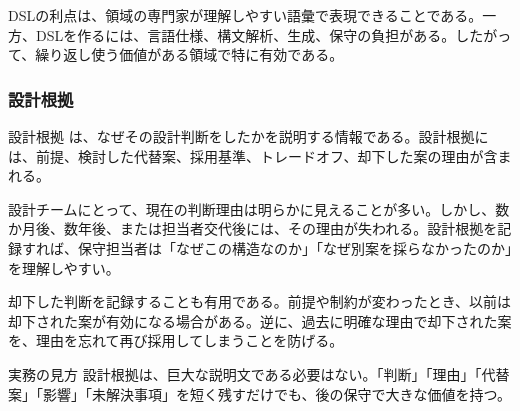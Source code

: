 DSLの利点は、領域の専門家が理解しやすい語彙で表現できることである。一方、DSLを作るには、言語仕様、構文解析、生成、保守の負担がある。したがって、繰り返し使う価値がある領域で特に有効である。

\subsubsection{設計根拠}

設計根拠 は、なぜその設計判断をしたかを説明する情報である。設計根拠には、前提、検討した代替案、採用基準、トレードオフ、却下した案の理由が含まれる。

設計チームにとって、現在の判断理由は明らかに見えることが多い。しかし、数か月後、数年後、または担当者交代後には、その理由が失われる。設計根拠を記録すれば、保守担当者は「なぜこの構造なのか」「なぜ別案を採らなかったのか」を理解しやすい。

却下した判断を記録することも有用である。前提や制約が変わったとき、以前は却下された案が有効になる場合がある。逆に、過去に明確な理由で却下された案を、理由を忘れて再び採用してしまうことを防げる。

\begin{pointbox}{実務の見方}
設計根拠は、巨大な説明文である必要はない。「判断」「理由」「代替案」「影響」「未解決事項」を短く残すだけでも、後の保守で大きな価値を持つ。
\end{pointbox}

